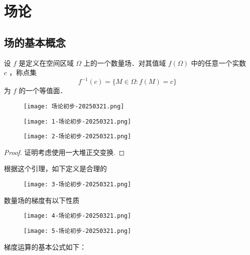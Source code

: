 \section{场论}

\subsection{场的基本概念}

\begin{definition}[等值面]
设 $f$ 是定义在空间区域 $\Omega$ 上的一个数量场．对其值域 $f(\Omega)$ 中的任意一个实数 $c$ ，称点集
\[
f^{-1}(c)=\{M \in \Omega: f(M)=c\}
\]为 $f$ 的一个等值面．
\end{definition}
\begin{figure}[H]
\centering
\texttt{[image: 场论初步-20250321.png]}
\label{}
\end{figure}

\begin{figure}[H]
\centering
\texttt{[image: 1-场论初步-20250321.png]}
\label{}
\end{figure}

\begin{figure}[H]
\centering
\texttt{[image: 2-场论初步-20250321.png]}
\label{}
\end{figure}

\begin{proof}
证明考虑使用一大堆正交变换.
\end{proof}

\begin{note}
根据这个引理，如下定义是合理的
\end{note}
\begin{figure}[H]
\centering
\texttt{[image: 3-场论初步-20250321.png]}
\label{}
\end{figure}

数量场的梯度有以下性质
\begin{figure}[H]
\centering
\texttt{[image: 4-场论初步-20250321.png]}
\label{}
\end{figure}

\begin{figure}[H]
\centering
\texttt{[image: 5-场论初步-20250321.png]}
\label{}
\end{figure}

梯度运算的基本公式如下：

